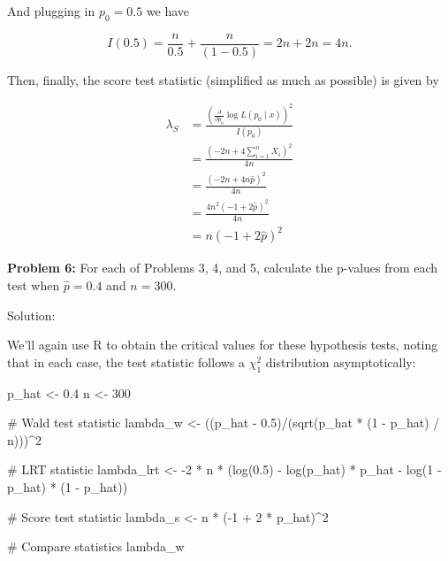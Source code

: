 \documentclass[
  letterpaper,
  DIV=11,
  numbers=noendperiod]{scrreprt}
\newenvironment{Shaded}{\begin{snugshade}}{\end{snugshade}}
\newcommand{\CommentTok}[1]{\textcolor[rgb]{0.37,0.37,0.37}{#1}}
\newcommand{\DecValTok}[1]{\textcolor[rgb]{0.68,0.00,0.00}{#1}}
\newcommand{\FloatTok}[1]{\textcolor[rgb]{0.68,0.00,0.00}{#1}}
\newcommand{\FunctionTok}[1]{\textcolor[rgb]{0.28,0.35,0.67}{#1}}
\newcommand{\NormalTok}[1]{\textcolor[rgb]{0.00,0.23,0.31}{#1}}
\newcommand{\OtherTok}[1]{\textcolor[rgb]{0.00,0.23,0.31}{#1}}
\newcommand{\SpecialCharTok}[1]{\textcolor[rgb]{0.37,0.37,0.37}{#1}}
\begin{document}
And plugging in \(p_0 = 0.5\) we have

\[
I(0.5) = \frac{n}{0.5}  + \frac{n}{(1 - 0.5)} = 2n + 2n = 4n.
\]

Then, finally, the score test statistic (simplified as much as possible)
is given by

\begin{align*}
    \lambda_S & = \frac{\left( \frac{\partial}{\partial p_0} \log L(p_0 \mid x) \right)^2}{I(p_0)} \\
    & = \frac{\left( -2n + 4\sum_{i = 1}^n X_i\right)^2}{4n} \\
    & = \frac{\left( -2n + 4n \hat{p}\right)^2}{4n} \\
    & = \frac{4n^2\left( -1 + 2 \hat{p}\right)^2}{4n} \\
    & = n\left( -1 + 2 \hat{p}\right)^2
\end{align*}

\textbf{Problem 6:} For each of Problems 3, 4, and 5, calculate the
p-values from each test when \(\hat{p} = 0.4\) and \(n = 300\).

Solution:

We'll again use R to obtain the critical values for these hypothesis
tests, noting that in each case, the test statistic follows a
\(\chi^2_1\) distribution asymptotically:

\begin{Shaded}
\begin{Highlighting}[]
\NormalTok{p\_hat }\OtherTok{\textless{}{-}} \FloatTok{0.4}
\NormalTok{n }\OtherTok{\textless{}{-}} \DecValTok{300}

\CommentTok{\# Wald test statistic}
\NormalTok{lambda\_w }\OtherTok{\textless{}{-}}\NormalTok{ ((p\_hat }\SpecialCharTok{{-}} \FloatTok{0.5}\NormalTok{)}\SpecialCharTok{/}\NormalTok{(}\FunctionTok{sqrt}\NormalTok{(p\_hat }\SpecialCharTok{*}\NormalTok{ (}\DecValTok{1} \SpecialCharTok{{-}}\NormalTok{ p\_hat) }\SpecialCharTok{/}\NormalTok{ n)))}\SpecialCharTok{\^{}}\DecValTok{2}

\CommentTok{\# LRT statistic}
\NormalTok{lambda\_lrt }\OtherTok{\textless{}{-}} \SpecialCharTok{{-}}\DecValTok{2} \SpecialCharTok{*}\NormalTok{ n }\SpecialCharTok{*}\NormalTok{ (}\FunctionTok{log}\NormalTok{(}\FloatTok{0.5}\NormalTok{) }\SpecialCharTok{{-}} \FunctionTok{log}\NormalTok{(p\_hat) }\SpecialCharTok{*}\NormalTok{ p\_hat }\SpecialCharTok{{-}} \FunctionTok{log}\NormalTok{(}\DecValTok{1} \SpecialCharTok{{-}}\NormalTok{ p\_hat) }\SpecialCharTok{*}\NormalTok{ (}\DecValTok{1} \SpecialCharTok{{-}}\NormalTok{ p\_hat))}

\CommentTok{\# Score test statistic}
\NormalTok{lambda\_s }\OtherTok{\textless{}{-}}\NormalTok{ n }\SpecialCharTok{*}\NormalTok{ (}\SpecialCharTok{{-}}\DecValTok{1} \SpecialCharTok{+} \DecValTok{2} \SpecialCharTok{*}\NormalTok{ p\_hat)}\SpecialCharTok{\^{}}\DecValTok{2}

\CommentTok{\# Compare statistics}
\NormalTok{lambda\_w}
\end{Highlighting}
\end{Shaded}
\end{document}
